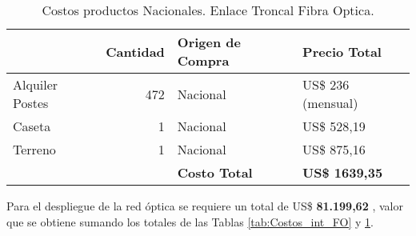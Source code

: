 \begin{table}[htbp]
  \centering
    \begin{tabular}{|r|r|l|l|}
    \hline
    \rowcolor[HTML]{C5D9F1} \multicolumn{1}{|l|}{\textbf{Descripción}} & \multicolumn{1}{l|}{\textbf{Cantidad}} & \textbf{Origen de Compra} & \textbf{Precio Total} \bigstrut\\
    \hline
    \multicolumn{1}{|l|}{Alquiler Postes} & 472   & Nacional & US\$ 236 (mensual) \bigstrut\\
    \hline
    \multicolumn{1}{|l|}{Caseta} & 1     & Nacional & US\$ 528,19 \bigstrut\\
    \hline
    \multicolumn{1}{|l|}{Terreno} & 1     & Nacional & US\$ 875,16 \bigstrut\\
    \hline
    \rowcolor[HTML]{C5D9F1}       &       & \textbf{Costo Total} & \textbf{US\$ 1639,35} \bigstrut\\
    \hline
    \end{tabular}%
\caption{Costos productos Nacionales. Enlace Troncal Fibra Optica.}
  \label{tab:Costos_nac_FO}%
\end{table}%



Para el despliegue de la red óptica se requiere un total de  US\$ \textbf{81.199,62} , valor que se obtiene sumando los totales de las Tablas \ref{tab:Costos_int_FO} y \ref{tab:Costos_nac_FO}.



\newpage






